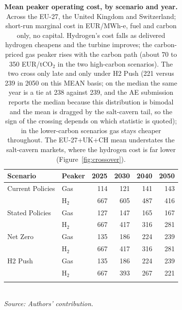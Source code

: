 \begin{table}[htbp]
\centering
\footnotesize
\caption{\textbf{Mean peaker operating cost, by scenario and year.} Across the EU-27, the United Kingdom and Switzerland; short-run marginal cost in EUR/MWh-e, fuel and carbon only, no capital. Hydrogen's cost falls as delivered hydrogen cheapens and the turbine improves; the carbon-priced gas peaker rises with the carbon path (about 70 to 350 EUR/tCO$_2$ in the two high-carbon scenarios). The two cross only late and only under H2 Push (221 versus 239 in 2050 on this MEAN basis; on the median the same year is a tie at 238 against 239, and the AE submission reports the median because this distribution is bimodal and the mean is dragged by the salt-cavern tail, so the sign of the crossing depends on which statistic is quoted); in the lower-carbon scenarios gas stays cheaper throughout. The EU-27+UK+CH mean understates the salt-cavern markets, where the hydrogen cost is far lower (Figure~\ref{fig:crossover}).}
\label{tab:opcost}
\begin{tabular}{llrrrr}
\toprule
Scenario & Peaker & 2025 & 2030 & 2040 & 2050 \\
\midrule
Current Policies & Gas & 114 & 121 & 141 & 143 \\
& H$_2$ & 667 & 605 & 487 & 416 \\
\addlinespace
Stated Policies & Gas & 127 & 147 & 165 & 167 \\
& H$_2$ & 667 & 417 & 316 & 281 \\
\addlinespace
Net Zero & Gas & 135 & 186 & 224 & 239 \\
& H$_2$ & 667 & 417 & 316 & 281 \\
\addlinespace
H2 Push & Gas & 135 & 186 & 224 & 239 \\
& H$_2$ & 667 & 393 & 267 & 221 \\
\addlinespace
\bottomrule
\end{tabular}
\\[8pt]{\footnotesize\textit{Source: Authors' contribution.}}
\end{table}
